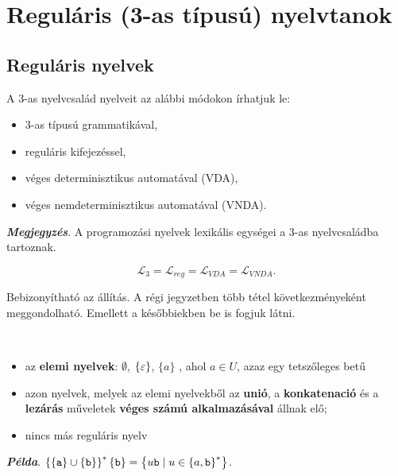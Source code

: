 \chapter{Reguláris (3-as típusú) nyelvtanok}

\section{Reguláris nyelvek}

A 3-as nyelvcsalád nyelveit az alábbi módokon írhatjuk le:
\begin{itemize}
	\item 3-as típusú grammatikával,
	\item reguláris kifejezéssel,
	\item véges determinisztikus automatával (VDA),
	\item véges nemdeterminisztikus automatával (VNDA).
\end{itemize}

\textbf{\textit{Megjegyzés}}. A programozási nyelvek lexikális egységei a 3-as nyelvcsaládba tartoznak.

\begin{tcolorbox}
	\begin{proposition}
		\[ \mathcal{L}_3 = \mathcal{L}_{reg} = \mathcal{L}_{VDA} = \mathcal{L}_{VNDA}. \]
	\end{proposition}
\end{tcolorbox}

Bebizonyítható az állítás. A régi jegyzetben több tétel következményeként meggondolható. Emellett a későbbiekben be is fogjuk látni.

\begin{tcolorbox}
	\begin{definition}
		~~
		\begin{itemize}
			\item az \textbf{elemi nyelvek}: $\emptyset$, $\{\varepsilon\}$, $\{a\}$ , ahol $a \in U$,
			azaz egy tetszőleges betű
			\item  azon nyelvek, melyek az elemi nyelvekből az \textbf{unió}, a \textbf{konkatenació} és a \textbf{lezárás}
			műveletek \textbf{véges számú alkalmazásával} állnak elő;
			\item  nincs más reguláris nyelv
		\end{itemize}
	\end{definition}
\end{tcolorbox}

\textbf{\textit{Példa}}. $\left\{ \{\verb*|a|\} \cup \left\{\verb*|b|\right\} \right\}^*\{\verb*|b|\} = \left\{u\verb*|b| \mid u \in \left\{a,\verb*|b|\right\}^* \right\}$.

